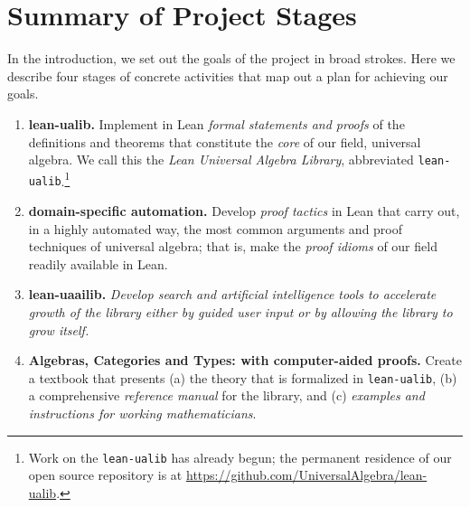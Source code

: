 \documentclass[11pt]{amsart}  %
\begin{document}







\fi











\section{Summary of Project Stages}
In the introduction, we set out the goals of the project in broad strokes. 
Here we describe four stages of concrete activities that map out a plan for 
achieving our goals.
\begin{enumerate}
\item[Stage 1.] {\bf lean-ualib.} Implement in Lean \textsl{formal statements and proofs} of the definitions and theorems that constitute the \textsl{core} of our field, universal algebra.
  We call this the \textsl{Lean Universal Algebra Library}, abbreviated {\tt lean-ualib}.\footnote{Work on the {\tt lean-ualib} has already begun; the permanent residence of 
  our open source repository is at \href{https://github.com/UniversalAlgebra/lean-ualib}{https://github.com/UniversalAlgebra/lean-ualib}.}
\item[Stage 2.] {\bf domain-specific automation.} Develop \textsl{proof tactics} in Lean that carry out, in a highly automated way, the most common arguments and proof techniques of universal algebra; that is, make the \textsl{proof idioms} of our field readily available in Lean.
\item[Stage 3.] {\bf lean-uaailib.}  \textsl{Develop search and artificial intelligence tools to accelerate growth of the library either by guided user input or by allowing the
  library to grow itself.}
\item[Stage 4.] {\bf Algebras, Categories and Types: with computer-aided proofs.} Create a textbook that presents (a) the theory that is formalized in {\tt lean-ualib}, (b) a comprehensive \textsl{reference manual} for the library, and (c) \emph{examples and instructions for working mathematicians}.
\end{enumerate}  
 
\end{document}
